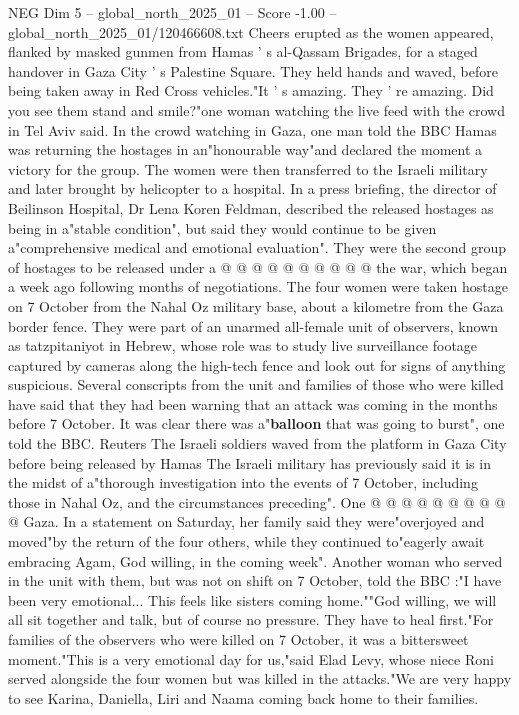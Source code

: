 \begin{textsample}{NEG Dim 5 – global\_north\_2025\_01 – Score -1.00 – global\_north\_2025\_01/120466608.txt}  \label{ex:f5_neg_075}
Cheers erupted as the women appeared, flanked by masked gunmen from Hamas ' s al-Qassam Brigades, for a staged handover in Gaza City ' s Palestine Square.
They held hands and waved, before being taken away in Red Cross vehicles."It ' s amazing.
They ' re amazing.
Did you see them stand and smile?"one woman watching the live feed with the crowd in Tel Aviv said.
In the crowd watching in Gaza, one man told the BBC Hamas was returning the hostages in an"honourable way"and declared the moment a victory for the group.
The women were then transferred to the Israeli military and later brought by helicopter to a hospital.
In a press briefing, the director of Beilinson Hospital, Dr Lena Koren Feldman, described the released hostages as being in a"stable condition", but said they would continue to be given a"comprehensive medical and emotional evaluation".
They were the second group of hostages to be released under a @ @ @ @ @ @ @ @ @ @ the war, which began a week ago following months of negotiations.
The four women were taken hostage on 7 October from the Nahal Oz military base, about a kilometre from the Gaza border fence.
They were part of an unarmed all-female unit of observers, known as tatzpitaniyot in Hebrew, whose role was to study live surveillance footage captured by cameras along the high-tech fence and look out for signs of anything suspicious.
Several conscripts from the unit and families of those who were killed have said that they had been warning that an attack was coming in the months before 7 October.
It was clear there was a"\textbf{balloon} that was going to burst", one told the BBC.
Reuters The Israeli soldiers waved from the platform in Gaza City before being released by Hamas The Israeli military has previously said it is in the midst of a"thorough investigation into the events of 7 October, including those in Nahal Oz, and the circumstances preceding".
One @ @ @ @ @ @ @ @ @ @ Gaza.
In a statement on Saturday, her family said they were"overjoyed and moved"by the return of the four others, while they continued to"eagerly await embracing Agam, God willing, in the coming week".
Another woman who served in the unit with them, but was not on shift on 7 October, told the BBC :"I have been very emotional...
This feels like sisters coming home.""God willing, we will all sit together and talk, but of course no pressure.
They have to heal first."For families of the observers who were killed on 7 October, it was a bittersweet moment."This is a very emotional day for us,"said Elad Levy, whose niece Roni served alongside the four women but was killed in the attacks."We are very happy to see Karina, Daniella, Liri and Naama coming back home to their families.

\end{textsample}
